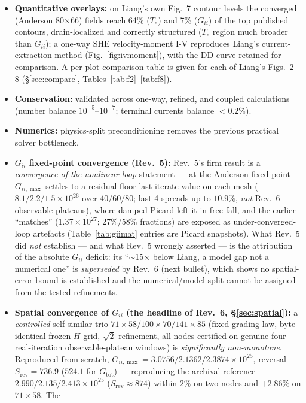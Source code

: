 \documentclass[11pt]{article}
\begin{document}
\begin{itemize}[leftmargin=1.4em,itemsep=2pt]
grid-stable; $T_e$ converges toward $\sim\!\SI{3200}{K}$.
\item \textbf{Quantitative overlays:} on Liang's own Fig.~7 contour levels the converged
(Anderson 80$\times$66) fields reach 64\% ($T_e$) and 7\% ($G_{ii}$) of the top
published contours, drain-localized and correctly structured ($T_e$ region much broader than
$G_{ii}$); a one-way SHE velocity-moment I-V reproduces Liang's current-extraction method
(Fig.~\ref{fig:ivmoment}), with the DD curve retained for comparison. A per-plot comparison table is
given for each of Liang's Figs.~2--8 (\S\ref{sec:compare}, Tables~\ref{tab:f2}--\ref{tab:f8}).
\item \textbf{Conservation:} validated across one-way, refined, and coupled calculations
(number balance $10^{-5}$--$10^{-7}$; terminal currents balance $<0.2\%$).
\item \textbf{Numerics:} physics-split preconditioning removes the previous practical solver
bottleneck.
\item \textbf{$G_{ii}$ fixed-point convergence (Rev.~5):} Rev.~5's firm result is a
\emph{convergence-of-the-nonlinear-loop} statement --- at the Anderson fixed point $G_{ii,\max}$
settles to a residual-floor last-iterate value on each mesh ($8.1/2.2/1.5\times10^{26}$ over
$40/60/80$; last-4 spreads up to $10.9\%$, \emph{not} Rev.~6 observable plateaus), where damped Picard left it
in free-fall, and the earlier ``matches'' ($1.37\times10^{27}$; 27\%/58\% fractions) are exposed as
under-converged-loop artefacts (Table~\ref{tab:giimat} entries are Picard snapshots). What Rev.~5 did
\emph{not} establish --- and what Rev.~5 wrongly asserted --- is the attribution of the absolute
$G_{ii}$ deficit: its ``$\sim$15$\times$ below Liang, a model gap not a numerical one'' is
\emph{superseded} by Rev.~6 (next bullet), which shows no spatial-error bound is established and the
numerical/model split cannot be assigned from the tested refinements.
\item \textbf{Spatial convergence of $G_{ii}$ (the headline of Rev.~6, \S\ref{sec:spatial}):} a
\emph{controlled} self-similar trio $71{\times}58/100{\times}70/141{\times}85$ (fixed grading law,
byte-identical frozen $H$-grid, $\sqrt2$ refinement, all nodes certified on genuine four-real-iteration
observable-plateau windows) is \emph{significantly non-monotone}. Reproduced from scratch,
$G_{ii,\max}=3.0756/2.1362/2.3874\times10^{25}$, reversal $S_{\mathrm{rev}}=736.9$ ($524.1$ for
$G_{\mathrm{tot}}$) --- reproducing the archival reference $2.990/2.135/2.413\times10^{25}$
($S_{\mathrm{rev}}\approx874$) within $2\%$ on two nodes and $+2.86\%$ on $71{\times}58$. The

\end{itemize}
\end{document}
